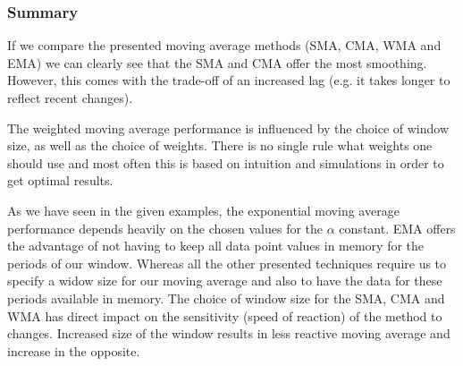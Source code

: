 \begin{figure}[ht]
	\caption{}
	\label{fig:emaGraph}
\end{figure}
\FloatBarrier
\subsubsection{Summary}
If we compare the presented moving average methods (SMA, CMA, WMA and EMA) we can clearly see that the SMA and CMA offer the most smoothing. However, this comes with the trade-off of an increased lag (e.g. it takes longer to reflect recent changes). 

The weighted moving average performance is influenced by the choice of window size, as well as the choice of weights. There is no single rule what weights one should use and most often this is based on intuition and simulations in order to get optimal results.

As we have seen in the given examples, the exponential moving average performance depends heavily on the chosen values for the $\alpha$ constant. EMA offers the advantage of not having to keep all data point values in memory for the periods of our window. Whereas all the other presented techniques require us to specify a widow size for our moving average and also to have the data for these periods available in memory. The choice of window size for the SMA, CMA and WMA has direct impact on the sensitivity (speed of reaction) of the method to changes. Increased size of the window results in less reactive moving average and increase in the opposite.

